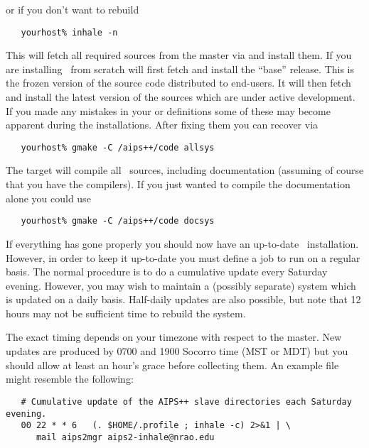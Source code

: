 \noindent
or if you don't want to rebuild

\begin{verbatim}
   yourhost% inhale -n
\end{verbatim}

\noindent
This will fetch all required sources from the master via  and
install them.  If you are installing \aipspp\ from scratch 
will first fetch and install the ``base'' release.  This is the frozen version
of the source code distributed to end-users.  It will then fetch and install
the latest version of the sources which are under active development.  If you
made any mistakes in your  or  definitions some of
these may become apparent during the installations.  After fixing them you can
recover via

\begin{verbatim}
   yourhost% gmake -C /aips++/code allsys
\end{verbatim}

\noindent
The  target will compile all \aipspp\ sources, including
documentation (assuming of course that you have the compilers).  If you just
wanted to compile the documentation alone you could use

\begin{verbatim}
   yourhost% gmake -C /aips++/code docsys
\end{verbatim}

If everything has gone properly you should now have an up-to-date \aipspp\ 
installation.  However, in order to keep it up-to-date you must define a
\unixexe{cron} job to run \exeref{inhale} on a regular basis.  The normal
procedure is to do a cumulative update every Saturday evening.  However, you
may wish to maintain a (possibly separate) system which is updated on a daily
basis.  Half-daily updates are also possible, but note that 12 hours may not
be sufficient time to rebuild the system.

The exact timing depends on your timezone with respect to the master.  New
updates are produced by 0700 and 1900 Socorro time (MST or MDT) but you should
allow at least an hour's grace before collecting them.  An example
\file{crontab} file might resemble the following:

\begin{verbatim}
   # Cumulative update of the AIPS++ slave directories each Saturday evening.
   00 22 * * 6   (. $HOME/.profile ; inhale -c) 2>&1 | \
      mail aips2mgr aips2-inhale@nrao.edu
\end{verbatim}

